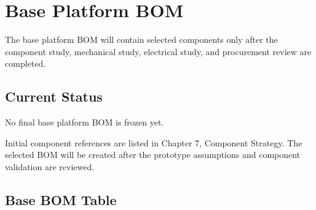 \chapter{Base Platform BOM}

The base platform BOM will contain selected components only after the component study, mechanical study, electrical study, and procurement review are completed.

\section{Current Status}

No final base platform BOM is frozen yet.

Initial component references are listed in Chapter 7, Component Strategy. The selected BOM will be created after the prototype assumptions and component validation are reviewed.

\section{Base BOM Table}


